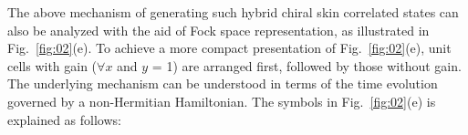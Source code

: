 \documentclass[longbibliography, aps, prx, amsmath, amssymb, amsfonts, twocolumn,superscriptaddress, footinbib]{revtex4-1}
\begin{document}
	The above mechanism of generating such hybrid chiral skin correlated states can also be analyzed with the aid of Fock space representation, as illustrated in Fig.~\ref{fig:02}(e). 
	To achieve a more compact presentation of Fig.~\ref{fig:02}(e), unit cells with gain ($\forall x$ and $y$ = 1) are arranged first, followed by those without gain.
	The underlying mechanism can be understood in terms of the time evolution governed by a non-Hermitian Hamiltonian. 
	The symbols in Fig.~\ref{fig:02}(e) is explained as follows:
\end{document}
